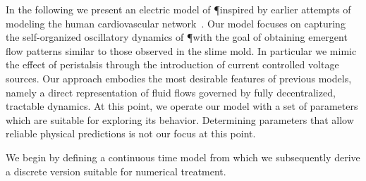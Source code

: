   In the following we present an electric model of \P inspired by earlier attempts of modeling the human cardiovascular network~\cite{stefanovska1999physics,dePater1964}. Our model focuses on capturing the self-organized oscillatory dynamics of \P with the goal of obtaining emergent flow patterns similar to those observed in the slime mold. In particular we mimic the effect of peristalsis through the introduction of current controlled voltage sources. Our approach embodies the most desirable features of previous models, namely a direct representation of fluid flows governed by fully decentralized, tractable dynamics. 
  At this point, we operate our model with a set of parameters which are suitable for exploring its behavior. Determining parameters that allow reliable physical predictions is not our focus at this point.

  We begin by defining a continuous time model from which we subsequently derive a discrete version suitable for numerical treatment.
